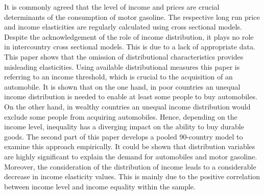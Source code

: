 It is commonly agreed that the level of income and prices are crucial determinants of the consumption of motor gasoline. The respective long run price and income elasticities are regularly calculated using cross sectional models. Despite the acknowledgement of the role of income distribution, it plays no role in intercountry cross sectional models. This is due to a lack of appropriate data. This paper shows that the omission of distributional characteristics provides misleading elasticities. Using available distributional measures this paper is referring to an income threshold, which is crucial to the acquisition of an automobile. It is shown that on the one hand, in poor countries an unequal income distribution is needed to enable at least some people to buy automobiles. On the other hand, in wealthy countries an unequal income distribution would exclude some people from acquiring automobiles. Hence, depending on the income level, inequality has a diverging impact on the ability to buy durable goods. The second part of this paper develops a pooled 90-country model to examine this approach empirically. It could be shown that distribution variables are highly significant to explain the demand for automobiles and motor gasoline. Moreover, the consideration of the distribution of income leads to a considerable decrease in income elasticity values. This is mainly due to the positive correlation between income level and income equality within the sample.
